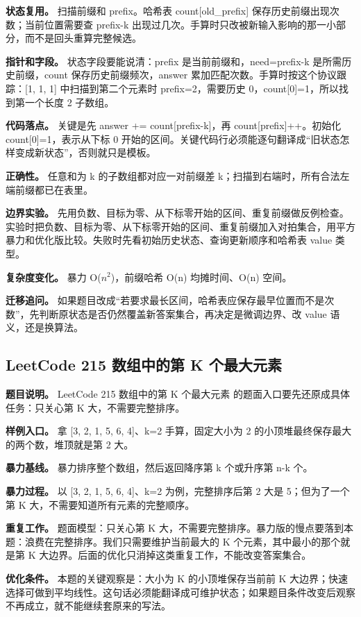 \textbf{状态复用。} 扫描前缀和 prefix。哈希表 count[old\_prefix] 保存历史前缀出现次数；当前位置需要查 prefix-k 出现过几次。手算时只改被新输入影响的那一小部分，而不是回头重算完整候选。

\textbf{指针和字段。} 状态字段要能说清：prefix 是当前前缀和，need=prefix-k 是所需历史前缀，count 保存历史前缀频次，answer 累加匹配次数。手算时按这个协议跟踪：[1, 1, 1] 中扫描到第二个元素时 prefix=2，需要历史 0，count[0]=1，所以找到第一个长度 2 子数组。

\textbf{代码落点。} 关键是先 answer += count[prefix-k]，再 count[prefix]++。初始化 count[0]=1，表示从下标 0 开始的区间。关键代码行必须能逐句翻译成“旧状态怎样变成新状态”，否则就只是模板。

\textbf{正确性。} 任意和为 k 的子数组都对应一对前缀差 k；扫描到右端时，所有合法左端前缀都已在表里。

\textbf{边界实验。} 先用负数、目标为零、从下标零开始的区间、重复前缀做反例检查。实验时把负数、目标为零、从下标零开始的区间、重复前缀加入对拍集合，用平方暴力和优化版比较。失败时先看初始历史状态、查询更新顺序和哈希表 value 类型。

\textbf{复杂度变化。} 暴力 O(\ensuremath{n^{2}})，前缀哈希 O(n) 均摊时间、O(n) 空间。

\textbf{迁移追问。} 如果题目改成“若要求最长区间，哈希表应保存最早位置而不是次数”，先判断原状态是否仍然覆盖新答案集合，再决定是微调边界、改 value 语义，还是换算法。

\subsection{LeetCode 215 数组中的第 K 个最大元素}

\textbf{题目说明。} LeetCode 215 数组中的第 K 个最大元素 的题面入口要先还原成具体任务：只关心第 K 大，不需要完整排序。

\textbf{样例入口。} 拿 [3, 2, 1, 5, 6, 4]、k=2 手算，固定大小为 2 的小顶堆最终保存最大的两个数，堆顶就是第 2 大。

\textbf{暴力基线。} 暴力排序整个数组，然后返回降序第 k 个或升序第 n-k 个。

\textbf{暴力过程。} 以 [3, 2, 1, 5, 6, 4]、k=2 为例，完整排序后第 2 大是 5；但为了一个第 K 大，不需要知道所有元素的完整顺序。

\textbf{重复工作。} 题面模型：只关心第 K 大，不需要完整排序。暴力版的慢点要落到本题：浪费在完整排序。我们只需要维护当前最大的 K 个元素，其中最小的那个就是第 K 大边界。后面的优化只消掉这类重复工作，不能改变答案集合。

\textbf{优化条件。} 本题的关键观察是：大小为 K 的小顶堆保存当前前 K 大边界；快速选择可做到平均线性。这句话必须能翻译成可维护状态；如果题目条件改变后观察不再成立，就不能继续套原来的写法。

